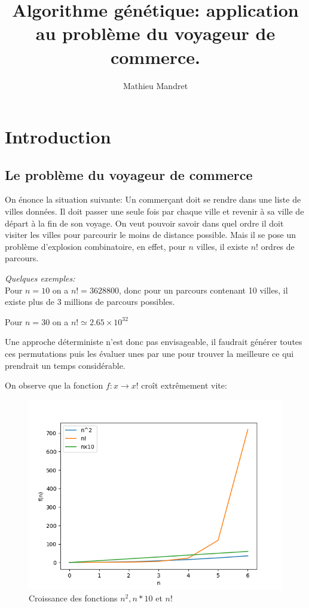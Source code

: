 \documentclass[11pt]{article}
\author{Mathieu Mandret}
\date{}
\title{Algorithme génétique: application au problème du voyageur de commerce.}
\begin{document}
\maketitle
\tableofcontents



\section{Introduction}
\label{sec-1}
\subsection{Le problème du voyageur de commerce}
\label{sec-1-1}
On énonce la situation suivante:
Un commerçant doit se rendre dans une liste de villes données. Il doit passer une seule fois par chaque ville
et revenir à sa ville de départ à la fin de son voyage.
On veut pouvoir savoir dans quel ordre il doit visiter les villes pour parcourir le moins de distance possible.
Mais il se pose un problème d'explosion combinatoire, en effet, pour $n$ villes, il existe $n!$ ordres de parcours.

\emph{Quelques exemples:} \\
Pour $n = 10$ on a $n! = 3628800$, donc pour un parcours contenant 10 villes, il existe plus de 3 millions de parcours possibles.

Pour $n = 30$ on a $n! \simeq 2.65 \times 10^{32}$

Une approche déterministe n'est donc pas envisageable, il faudrait générer toutes ces permutations puis les évaluer unes
par une pour trouver la meilleure ce qui prendrait un temps considérable. 

On observe que la fonction $f: x \rightarrow x!$ croît extrêmement vite:

\begin{figure}[htb]
\centering
\includegraphics[width=.9\linewidth]{./complexite.png}
\caption{Croissance des fonctions $n^2, n*10$ et $n!$}
\end{figure}
\end{document}
